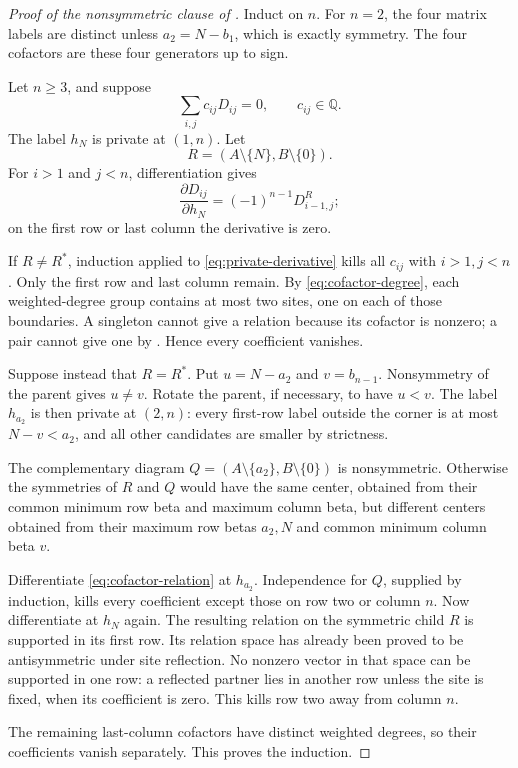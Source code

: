 \documentclass[11pt,a4paper]{amsart}
\numberwithin{equation}{section}
\theoremstyle{plain}
\theoremstyle{definition}
\newcommand{\Q}{\mathbb Q}
\begin{document}
\begin{proof}[Proof of the nonsymmetric clause of ]
Induct on \(n\).  For \(n=2\), the four matrix labels are distinct unless
\(a_2=N-b_1\), which is exactly symmetry.  The four cofactors are these
four generators up to sign.

Let \(n\ge3\), and suppose
\begin{equation}\label{eq:cofactor-relation}
 \sum_{i,j}c_{ij}D_{ij}=0,\qquad c_{ij}\in\Q.
\end{equation}
The label \(h_N\) is private at \((1,n)\).  Let
\[
 R=(A\setminus\{N\},B\setminus\{0\}).
\]
For \(i>1\) and \(j<n\), differentiation gives
\begin{equation}\label{eq:private-derivative}
 \frac{\partial D_{ij}}{\partial h_N}
   =(-1)^{n-1}D^R_{i-1,j};
\end{equation}
on the first row or last column the derivative is zero.

If \(R\ne R^*\), induction applied to \eqref{eq:private-derivative}
kills all \(c_{ij}\) with \(i>1,j<n\).  Only the first row and last
column remain.  By \eqref{eq:cofactor-degree}, each weighted-degree group
contains at most two sites, one on each of those boundaries.
A singleton cannot give a relation because its cofactor is nonzero;
a pair cannot give one by .  Hence every coefficient
vanishes.

Suppose instead that \(R=R^*\).  Put \(u=N-a_2\) and \(v=b_{n-1}\).
Nonsymmetry of the parent gives \(u\ne v\).  Rotate the parent, if necessary,
to have \(u<v\).  The label \(h_{a_2}\) is then private at \((2,n)\):
every first-row label outside the corner is at most \(N-v<a_2\), and all
other candidates are smaller by strictness.

The complementary diagram \(Q=(A\setminus\{a_2\},B\setminus\{0\})\) is
nonsymmetric.  Otherwise the symmetries of \(R\) and \(Q\) would have
the same center, obtained from their common minimum row beta and maximum
column beta, but different centers obtained from their maximum row betas
\(a_2,N\) and common minimum column beta \(v\).

Differentiate \eqref{eq:cofactor-relation} at \(h_{a_2}\).
Independence for \(Q\), supplied by induction, kills every coefficient
except those on row two or column \(n\).  Now differentiate at \(h_N\)
again.  The resulting relation on the symmetric child \(R\) is supported
in its first row.  Its relation space has already been proved to be
antisymmetric under site reflection.  No nonzero vector in that space can
be supported in one row: a reflected partner lies in another row unless
the site is fixed, when its coefficient is zero.  This kills row two away
from column \(n\).

The remaining last-column cofactors have distinct weighted degrees, so their
coefficients vanish separately.  This proves the induction.
\end{proof}
\end{document}
